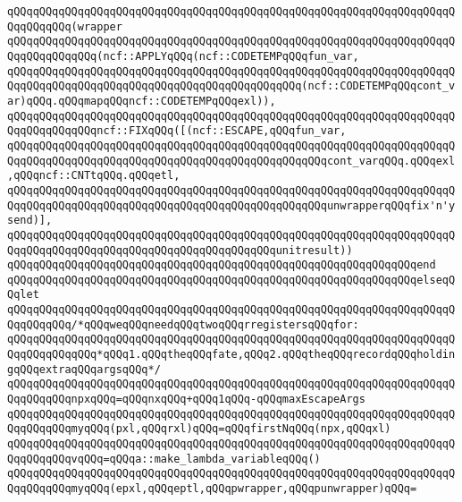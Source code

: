 \verb|qQQqqQQqqQQqqQQqqQQqqQQqqQQqqQQqqQQqqQQqqQQqqQQqqQQqqQQqqQQqqQQqqQQqqQQqqQQqqQQq(wrapper|\newline
\verb|qQQqqQQqqQQqqQQqqQQqqQQqqQQqqQQqqQQqqQQqqQQqqQQqqQQqqQQqqQQqqQQqqQQqqQQqqQQqqQQqqQQq(ncf::APPLYqQQq(ncf::CODETEMPqQQqfun_var,|\newline
\verb|qQQqqQQqqQQqqQQqqQQqqQQqqQQqqQQqqQQqqQQqqQQqqQQqqQQqqQQqqQQqqQQqqQQqqQQqqQQqqQQqqQQqqQQqqQQqqQQqqQQqqQQqqQQqqQQqqQQq(ncf::CODETEMPqQQqcont_var)qQQq.qQQqmapqQQqncf::CODETEMPqQQqexl)),|\newline
\verb|qQQqqQQqqQQqqQQqqQQqqQQqqQQqqQQqqQQqqQQqqQQqqQQqqQQqqQQqqQQqqQQqqQQqqQQqqQQqqQQqqQQqncf::FIXqQQq([(ncf::ESCAPE,qQQqfun_var,|\newline
\verb|qQQqqQQqqQQqqQQqqQQqqQQqqQQqqQQqqQQqqQQqqQQqqQQqqQQqqQQqqQQqqQQqqQQqqQQqqQQqqQQqqQQqqQQqqQQqqQQqqQQqqQQqqQQqqQQqqQQqqQQqcont_varqQQq.qQQqexl,qQQqncf::CNTtqQQq.qQQqetl,|\newline
\verb|qQQqqQQqqQQqqQQqqQQqqQQqqQQqqQQqqQQqqQQqqQQqqQQqqQQqqQQqqQQqqQQqqQQqqQQqqQQqqQQqqQQqqQQqqQQqqQQqqQQqqQQqqQQqqQQqqQQqqQQqunwrapperqQQqfix'n'ysend)],|\newline
\verb|qQQqqQQqqQQqqQQqqQQqqQQqqQQqqQQqqQQqqQQqqQQqqQQqqQQqqQQqqQQqqQQqqQQqqQQqqQQqqQQqqQQqqQQqqQQqqQQqqQQqqQQqqQQqqQQqunitresult))|\newline
\verb|qQQqqQQqqQQqqQQqqQQqqQQqqQQqqQQqqQQqqQQqqQQqqQQqqQQqqQQqqQQqqQQqend|\newline
\verb|qQQqqQQqqQQqqQQqqQQqqQQqqQQqqQQqqQQqqQQqqQQqqQQqqQQqqQQqqQQqqQQqelseqQQqlet|\newline
\verb|qQQqqQQqqQQqqQQqqQQqqQQqqQQqqQQqqQQqqQQqqQQqqQQqqQQqqQQqqQQqqQQqqQQqqQQqqQQqqQQq/*qQQqweqQQqneedqQQqtwoqQQqrregistersqQQqfor:|\newline
\verb|qQQqqQQqqQQqqQQqqQQqqQQqqQQqqQQqqQQqqQQqqQQqqQQqqQQqqQQqqQQqqQQqqQQqqQQqqQQqqQQqqQQq*qQQq1.qQQqtheqQQqfate,qQQq2.qQQqtheqQQqrecordqQQqholdingqQQqextraqQQqargsqQQq*/|\newline
\verb|qQQqqQQqqQQqqQQqqQQqqQQqqQQqqQQqqQQqqQQqqQQqqQQqqQQqqQQqqQQqqQQqqQQqqQQqqQQqqQQqnpxqQQq=qQQqnxqQQq+qQQq1qQQq-qQQqmaxEscapeArgs|\newline
\verb|qQQqqQQqqQQqqQQqqQQqqQQqqQQqqQQqqQQqqQQqqQQqqQQqqQQqqQQqqQQqqQQqqQQqqQQqqQQqqQQqmyqQQq(pxl,qQQqrxl)qQQq=qQQqfirstNqQQq(npx,qQQqxl)|\newline
\verb|qQQqqQQqqQQqqQQqqQQqqQQqqQQqqQQqqQQqqQQqqQQqqQQqqQQqqQQqqQQqqQQqqQQqqQQqqQQqqQQqvqQQq=qQQqa::make_lambda_variableqQQq()|\newline
\verb|qQQqqQQqqQQqqQQqqQQqqQQqqQQqqQQqqQQqqQQqqQQqqQQqqQQqqQQqqQQqqQQqqQQqqQQqqQQqqQQqmyqQQq(epxl,qQQqeptl,qQQqpwrapper,qQQqpunwrapper)qQQq=|\newline
